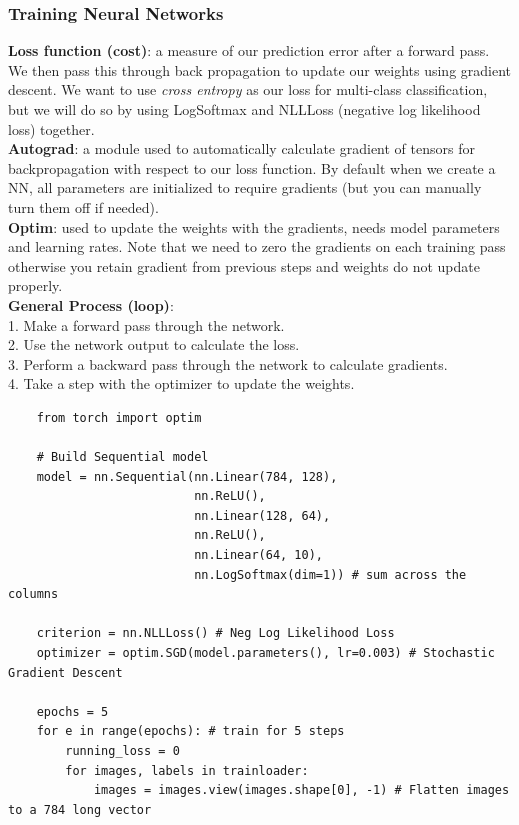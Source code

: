\documentclass[11pt, a4paper]{article}
\begin{document}
\begin{spacing}{1.1}
	\subsubsection{Training Neural Networks}
	\textbf{Loss function (cost)}: a measure of our prediction error after a forward pass. We then pass this through back propagation to update our weights using gradient descent. We want to use \textit{cross entropy} as our loss for multi-class classification, but we will do so by using LogSoftmax and NLLLoss (negative log likelihood loss) together. \vspace*{2mm}\\
	\textbf{Autograd}: a module used to automatically calculate gradient of tensors for backpropagation with respect to our loss function. By default when we create a NN, all parameters are initialized to require gradients (but you can manually turn them off if needed).\vspace*{2mm}\\
	\textbf{Optim}: used to update the weights with the gradients, needs model parameters and learning rates. Note that we need to zero the gradients on each training pass otherwise you retain gradient from previous steps and weights do not update properly. \vspace*{2mm}\\
	\textbf{General Process (loop)}: \\
	1. Make a forward pass through the network.\\
	2. Use the network output to calculate the loss.\\
	3. Perform a backward pass through the network to calculate gradients.\\
	4. Take a step with the optimizer to update the weights.
	\begin{lstlisting}
	from torch import optim
	
	# Build Sequential model
	model = nn.Sequential(nn.Linear(784, 128),
	                      nn.ReLU(),
	                      nn.Linear(128, 64),
	                      nn.ReLU(),
	                      nn.Linear(64, 10),
	                      nn.LogSoftmax(dim=1)) # sum across the columns

	criterion = nn.NLLLoss() # Neg Log Likelihood Loss
	optimizer = optim.SGD(model.parameters(), lr=0.003) # Stochastic Gradient Descent
	
	epochs = 5
	for e in range(epochs): # train for 5 steps
		running_loss = 0
		for images, labels in trainloader:
			images = images.view(images.shape[0], -1) # Flatten images to a 784 long vector
			

\end{lstlisting}
\end{spacing}
\end{document}
